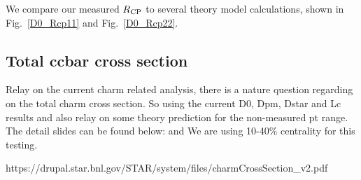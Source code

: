 We compare our measured $R_{\rm CP}$ to several theory model calculations, shown in Fig.~\ref{D0_Rcp11} and Fig.~\ref{D0_Rcp22}. 

\subsection{\label{result:totalCC} Total ccbar cross section}

Relay on the current charm related analysis, there is a nature question regarding on the total charm cross section. So using the current D0, Dpm, Dstar and Lc results and also relay on some theory prediction for the non-measured pt range. The detail slides can be found below: and We are using 10-40\% centrality for this testing.

https://drupal.star.bnl.gov/STAR/system/files/charmCrossSection\_v2.pdf


